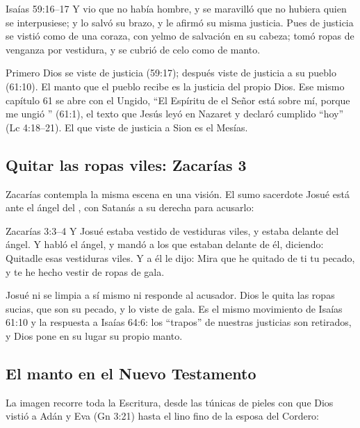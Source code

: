\begin{verso}{Isaías 59:16–17}
Y vio que no había hombre, y se maravilló que no hubiera quien se interpusiese; y lo salvó su brazo, y le afirmó su misma justicia. Pues de justicia se vistió como de una coraza, con yelmo de salvación en su cabeza; tomó ropas de venganza por vestidura, y se cubrió de celo como de manto.
\end{verso}

Primero Dios se viste de justicia (59:17); después viste de justicia a su pueblo (61:10). El manto que el pueblo recibe es la justicia del propio Dios. Ese mismo capítulo 61 se abre con el Ungido, ``El Espíritu de \SENOR{} el Señor está sobre mí, porque me ungió \SENOR'' (61:1), el texto que Jesús leyó en Nazaret y declaró cumplido ``hoy'' (Lc 4:18--21). El que viste de justicia a Sion es el Mesías.

\subsection{Quitar las ropas viles: Zacarías 3}
Zacarías contempla la misma escena en una visión. El sumo sacerdote Josué está ante el ángel del \SENOR, con Satanás a su derecha para acusarlo:

\begin{verso}{Zacarías 3:3–4}
Y Josué estaba vestido de vestiduras viles, y estaba delante del ángel. Y habló el ángel, y mandó a los que estaban delante de él, diciendo: Quitadle esas vestiduras viles. Y a él le dijo: Mira que he quitado de ti tu pecado, y te he hecho vestir de ropas de gala.
\end{verso}

Josué ni se limpia a sí mismo ni responde al acusador. Dios le quita las ropas sucias, que son su pecado, y lo viste de gala. Es el mismo movimiento de Isaías 61:10 y la respuesta a Isaías 64:6: los ``trapos'' de nuestras justicias son retirados, y Dios pone en su lugar su propio manto.

\subsection{El manto en el Nuevo Testamento}
La imagen recorre toda la Escritura, desde las túnicas de pieles con que Dios vistió a Adán y Eva (Gn 3:21) hasta el lino fino de la esposa del Cordero:


